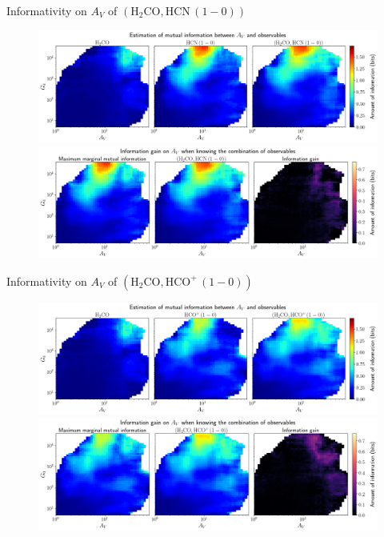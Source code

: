 \documentclass{beamer}
\begin{document}
\begin{frame}{Informativity on $A_V$ of $\left(\mathrm{H_2CO},\mathrm{HCN\,(1-0)}\right)$}
    \begin{figure}
        \centering
        \includegraphics[width=0.95\linewidth]{../mi/av__h2co_hcn10_mi.png}
        \vfill
        \includegraphics[width=0.95\linewidth]{../mi/av__h2co_hcn10_mi_gain.png}
    \end{figure}
\end{frame}

\begin{frame}{Informativity on $A_V$ of $\left(\mathrm{H_2CO},\mathrm{HCO^+\,(1-0)}\right)$}
    \begin{figure}
        \centering
        \includegraphics[width=0.95\linewidth]{../mi/av__h2co_hcop10_mi.png}
        \vfill
        \includegraphics[width=0.95\linewidth]{../mi/av__h2co_hcop10_mi_gain.png}
    \end{figure}
\end{frame}
\end{document}
